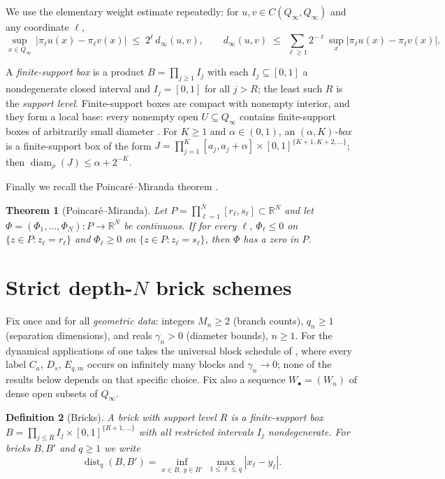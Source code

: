 \documentclass[11pt]{article}
\newtheorem{theorem}{Theorem}[section]
\newtheorem{definition}[theorem]{Definition}
\newcommand{\Q}{Q_\infty}
\newcommand{\dist}{\operatorname{dist}}
\newcommand{\diam}{\operatorname{diam}}
\begin{document}
We use the elementary weight estimate repeatedly: for $u,v\in C(\Q,\Q)$ and any
coordinate $\ell$,
\begin{equation}\label{eq:weight}
\sup_{x\in\Q}\,\bigl|\pi_\ell u(x)-\pi_\ell v(x)\bigr|
\;\le\;2^{\ell}\,d_\infty(u,v),
\qquad
d_\infty(u,v)\;\le\;\sum_{\ell\ge1}2^{-\ell}\sup_x|\pi_\ell u(x)-\pi_\ell v(x)|.
\end{equation}

A \emph{finite-support box} is a product $B=\prod_{j\ge1}I_j$ with each
$I_j\subseteq[0,1]$ a nondegenerate closed interval and $I_j=[0,1]$ for all $j>R$; the
least such $R$ is the \emph{support level}.  Finite-support boxes are compact with
nonempty interior, and they form a local base: every nonempty open $U\subseteq\Q$
contains finite-support boxes of arbitrarily small diameter
\cite[Lemma~10.2]{Shmalo2026}.  For $K\ge1$ and $\alpha\in(0,1)$, an
\emph{$(\alpha,K)$-box} is a finite-support box of the form
$J=\prod_{j=1}^{K}[a_j,a_j+\alpha]\times[0,1]^{\{K+1,K+2,\dots\}}$; then
$\diam_\rho(J)\le\alpha+2^{-K}$.

Finally we recall the Poincar\'e--Miranda theorem \cite{Miranda,Kulpa}.

\begin{theorem}[Poincar\'e--Miranda]\label{thm:miranda}
Let $P=\prod_{\ell=1}^{N}[r_\ell,s_\ell]\subset\mathbb R^N$ and let
$\Phi=(\Phi_1,\dots,\Phi_N):P\to\mathbb R^N$ be continuous.  If for every $\ell$,
$\Phi_\ell\le0$ on $\{z\in P: z_\ell=r_\ell\}$ and $\Phi_\ell\ge0$ on
$\{z\in P: z_\ell=s_\ell\}$, then $\Phi$ has a zero in $P$.
\end{theorem}

\section{Strict depth-\texorpdfstring{$N$}{N} brick schemes}\label{sec:schemes}

Fix once and for all \emph{geometric data}: integers $M_n\ge2$ (branch counts),
$q_n\ge1$ (separation dimensions), and reals $\gamma_n>0$ (diameter bounds), $n\ge1$.
For the dynamical applications of \cite{Shmalo2026} one takes the universal block
schedule of \cite[Section~12]{Shmalo2026}, where every label $C_a$, $D_s$, $E_{q,m}$
occurs on infinitely many blocks and $\gamma_n\to0$; none of the results below depends
on that specific choice.  Fix also a sequence $W_\bullet=(W_n)$ of dense open subsets
of $\Q$.

\begin{definition}[Bricks]\label{def:brick}
A \emph{brick} with support level $R$ is a finite-support box
$B=\prod_{j\le R}I_j\times[0,1]^{\{R+1,\dots\}}$ with all restricted intervals $I_j$
nondegenerate.  For bricks $B,B'$ and $q\ge1$ we write
\[
\dist_q(B,B')=\inf_{x\in B,\,y\in B'}\ \max_{1\le\ell\le q}|x_\ell-y_\ell|.
\]
\end{definition}
\end{document}
